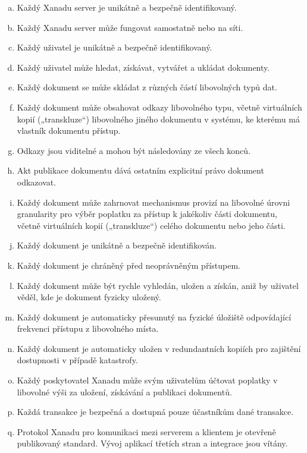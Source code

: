 \begin{enumerate}[a)]
\item Každý Xanadu server je unikátně a bezpečně identifikovaný.
\item Každý Xanadu server může fungovat samostatně nebo na síti.
\item Každý uživatel je unikátně a bezpečně identifikovaný.
\item Každý uživatel může hledat, získávat, vytvářet a ukládat dokumenty.
\item Každý dokument se může skládat z různých částí libovolných typů dat.
\item Každý dokument může obsahovat odkazy libovolného typu, včetně virtuálních kopií („transkluze“) libovolného jiného dokumentu v systému, ke kterému má vlastník dokumentu přístup.
\item Odkazy jsou viditelné a mohou být následovány ze všech konců.
\item Akt publikace dokumentu dává ostatním explicitní právo dokument odkazovat.
\item Každý dokument může zahrnovat mechanismus provizí na libovolné úrovni granularity pro výběr poplatku za přístup k jakékoliv části dokumentu, včetně virtuálních kopií („transkluze“) celého dokumentu nebo jeho části.
\item Každý dokument je unikátně a bezpečně identifikován.
\item Každý dokument je chráněný před neoprávněným přístupem.
\item Každý dokument může být rychle vyhledán, uložen a získán, aniž by uživatel věděl, kde je dokument fyzicky uložený.
\item Každý dokument je automaticky přesunutý na fyzické úložiště odpovídající frekvenci přístupu z libovolného místa.
\item Každý dokument je automaticky uložen v redundantních kopiích pro zajištění dostupnosti v případě katastrofy.
\item Každý poskytovatel Xanadu může svým uživatelům účtovat poplatky v libovolné výši za uložení, získávání a publikaci dokumentů.
\item Každá transakce je bezpečná a dostupná pouze účastníkům dané transakce.
\item Protokol Xanadu pro komunikaci mezi serverem a klientem je otevřeně publikovaný standard. Vývoj aplikací třetích stran a integrace jsou vítány.
\end{enumerate}

